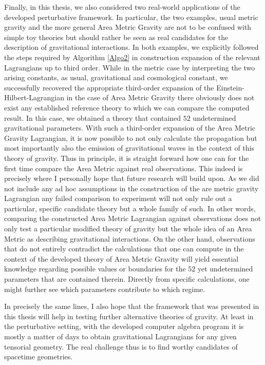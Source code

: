 \documentclass[a4paper,12pt, DIV=14, BCOR=5mm, twoside, headsepline, numbers=noenddot]{scrbook}
\begin{document}
Finally, in this thesis, we also considered two real-world applications of the developed perturbative framework. In particular, the two examples, usual metric gravity and the more general Area Metric Gravity are not to be confused with simple toy theories but should rather be seen as real candidates for the description of gravitational interactions. In both examples, we explicitly followed the steps required by Algorithm \ref{Algo2} in construction expansion of the relevant Lagrangians up to third order. While in the metric case by interpreting the two arising constants, as usual, gravitational and cosmological constant, we successfully recovered the appropriate third-order expansion of the Einstein-Hilbert-Lagrangian in the case of Area Metric Gravity there obviously does not exist any established reference theory to which we can compare the computed result. In this case, we obtained a theory that contained $52$ undetermined gravitational parameters. 
With such a third-order expansion of the Area Metric Gravity Lagrangian, it is now possible to not only calculate the propagation but most importantly also the emission of gravitational waves in the context of this theory of gravity. Thus in principle, it is straight forward how one can for the first time compare the Area Metric against real observations. This indeed is precisely where I personally hope that future research will build upon. 
As we did not include any ad hoc assumptions in the construction of the are metric gravity Lagrangian any failed comparison to experiment will not only rule out a particular, specific candidate theory but a whole family of such. In other words, comparing the constructed Area Metric Lagrangian against observations does not only test a particular modified theory of gravity but the whole idea of an Area Metric as describing gravitational interactions. 
On the other hand, observations that do not entirely contradict the calculations that one can compute in the context of the developed theory of Area Metric Gravity will yield essential knowledge regarding possible values or boundaries for the $52$ yet undetermined parameters that are contained therein. 
Directly from specific calculations, one might further see which parameters contribute to which regime. 

In precisely the same lines, I also hope that the framework that was presented in this thesis will help in testing further alternative theories of gravity. At least in the perturbative setting, with the developed computer algebra program it is mostly a matter of days to obtain gravitational Lagrangians for any given tensorial geometry. The real challenge thus is to find worthy candidates of spacetime geometries. 
\end{document}
